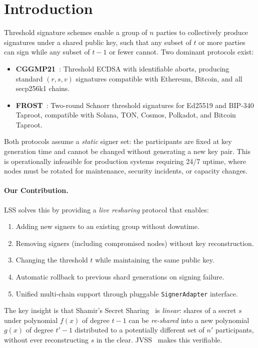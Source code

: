 \section{Introduction}


Threshold signature schemes enable a group of $n$ parties to collectively produce signatures under a shared public key, such that any subset of $t$ or more parties can sign while any subset of $t - 1$ or fewer cannot. Two dominant protocols exist:

\begin{itemize}[nosep]
  \item \textbf{CGGMP21}~\cite{cggmp21}: Threshold ECDSA with identifiable aborts, producing standard $(r, s, v)$ signatures compatible with Ethereum, Bitcoin, and all secp256k1 chains.
  \item \textbf{FROST}~\cite{frost}: Two-round Schnorr threshold signatures for Ed25519 and BIP-340 Taproot, compatible with Solana, TON, Cosmos, Polkadot, and Bitcoin Taproot.
\end{itemize}

Both protocols assume a \emph{static} signer set: the participants are fixed at key generation time and cannot be changed without generating a new key pair. This is operationally infeasible for production systems requiring 24/7 uptime, where nodes must be rotated for maintenance, security incidents, or capacity changes.

\paragraph{Our Contribution.} LSS solves this by providing a \emph{live resharing} protocol that enables:
\begin{enumerate}[nosep]
  \item Adding new signers to an existing group without downtime.
  \item Removing signers (including compromised nodes) without key reconstruction.
  \item Changing the threshold $t$ while maintaining the same public key.
  \item Automatic rollback to previous shard generations on signing failure.
  \item Unified multi-chain support through pluggable \texttt{SignerAdapter} interface.
\end{enumerate}

The key insight is that Shamir's Secret Sharing~\cite{shamir1979} is \emph{linear}: shares of a secret $s$ under polynomial $f(x)$ of degree $t - 1$ can be \emph{re-shared} into a new polynomial $g(x)$ of degree $t' - 1$ distributed to a potentially different set of $n'$ participants, without ever reconstructing $s$ in the clear. JVSS~\cite{pedersen1991} makes this verifiable.


